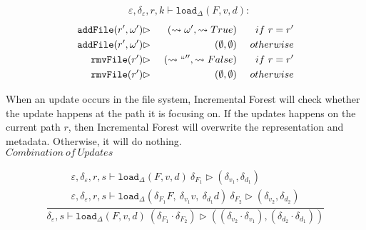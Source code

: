 \documentclass[10pt,twoside,a4paper]{article}
\theoremstyle{theorem}
\theoremstyle{lemma}
\theoremstyle{property}
\theoremstyle{definition}
\theoremstyle{assumption}
\def\snd{\pi_2}
\begin{document}
\begin{align*}
	& \varepsilon, \delta_\varepsilon, r, k \vdash \mathtt{load}_\Delta (F,v,d):
\end{align*}
\begin{align*}
	\mathtt{addFile}(r',\omega') &\rhd& ~(\leadsto \omega', \leadsto True)			& &~if ~r = r' \\
	\mathtt{addFile}(r',\omega') &\rhd& ~(\emptyset,\emptyset)								& &~otherwise \\
	\mathtt{rmvFile}(r') 		 &\rhd& ~(\leadsto `` '', \leadsto False)			& &~if ~r = r' \\
	\mathtt{rmvFile}(r')		 &\rhd& ~(\emptyset,\emptyset)								& &~otherwise 
\end{align*}

When an update occurs in the file system, Incremental Forest will check whether the update happens at the path it is focusing on.
If the updates happens on the current path $r$, then Incremental Forest will overwrite the representation and metadata.
Otherwise, it will do nothing.\\

$\boxed{Combination ~ of ~ Updates}$

\begin{displaymath}
	\frac{\begin{array}{c}
		\varepsilon, \delta_\varepsilon, r, s \vdash \mathtt{load}_\Delta (F,v,d)~ \delta_{F_1} \rhd (\delta_{v_1}, \delta_{d_1})\\
		\varepsilon, \delta_\varepsilon, r, s \vdash \mathtt{load}_\Delta (\delta_{F_1} F,~\delta_{v_1} v,~\delta_{d_1} d)~ \delta_{F_2} \rhd (\delta_{v_2}, \delta_{d_2})
	\end{array}}
	{\delta_\varepsilon, s \vdash \mathtt{load}_\Delta (F,v,d)~ (\delta_{F_1} \cdot \delta_{F_2}) \rhd ((\delta_{v_2} \cdot \delta_{v_1}), (\delta_{d_2} \cdot \delta_{d_1}))}
\end{displaymath}
\end{document}
